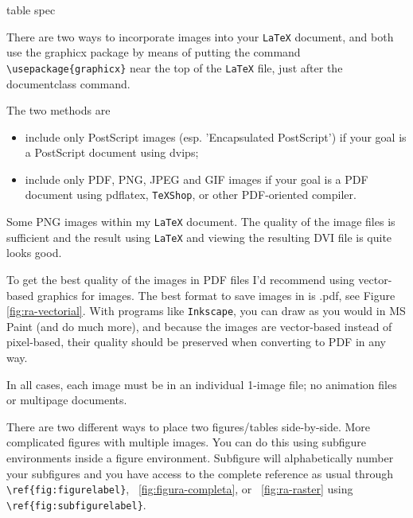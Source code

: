 \begin{tabular}[pos]{table spec}
            \begin{sloppypar}
                There are two ways to incorporate images into your \texttt{LaTeX} document, and both use the graphicx package by means of putting the command  \verb!\usepackage{graphicx}!  near the top of the \texttt{LaTeX} file, just after the documentclass command.
            \end{sloppypar}

            The two methods are

            \begin{itemize}
                \item  include only PostScript images (esp. 'Encapsulated PostScript') if your goal is a PostScript document using dvips;
                \item include only PDF, PNG, JPEG and GIF images if your goal is a PDF document using pdflatex, \texttt{TeXShop}, or other PDF-oriented compiler.
            \end{itemize}

            Some PNG images within my \texttt{LaTeX} document. The quality of the image files is sufficient and the result using \texttt{LaTeX} and viewing the resulting DVI file is quite looks good.

            To get the best quality of the images in PDF files I'd recommend using vector-based graphics for images. The best format to save images in is .pdf, see Figure \ref{fig:ra-vectorial}. With programs like \texttt{Inkscape}, you can draw as you would in MS Paint (and do much more), and because the images are vector-based instead of pixel-based, their quality should be preserved when converting to PDF in any way.

            In all cases, each image must be in an individual 1-image file; no animation files or multipage documents.

            There are two different ways to place two figures/tables side-by-side. More complicated figures with multiple images. You can do this using subfigure environments inside a figure environment. Subfigure will alphabetically number your subfigures and you have access to the complete reference as usual through \verb!\ref{fig:figurelabel}!, \figurename~\ref{fig:figura-completa}, or \figurename~\ref{fig:ra-raster} using \verb!\ref{fig:subfigurelabel}!.


\end{tabular}
